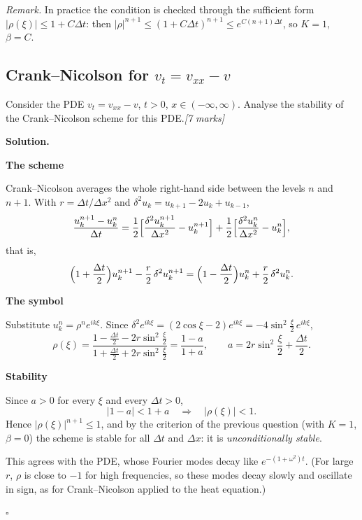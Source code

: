 \documentclass[11pt,a4paper]{article}
\newenvironment{solution}
  {\par\noindent\textbf{Solution.}\par\nobreak}
  {\par\hfill\(\square\)\par}
\newcommand{\step}[1]{\par\addvspace{0.5em}\noindent\textbf{#1}\par\nobreak}
\newcommand{\mk}[1]{\hfill\textit{[#1 marks]}}
\begin{document}
\textit{Remark.}  In practice the condition is checked through the
sufficient form \(|\rho(\xi)|\le1+C\Delta t\): then
\(|\rho|^{n+1}\le(1+C\Delta t)^{n+1}\le e^{C(n+1)\Delta t}\), so
\(K=1\), \(\beta=C\).

\subsection{Crank--Nicolson for \(v_t=v_{xx}-v\)}

\begin{qbox}
Consider the PDE \(v_t=v_{xx}-v\), \(t>0\), \(x\in(-\infty,\infty)\).
Analyse the stability of the Crank--Nicolson scheme for this PDE.\mk{7}
\end{qbox}

\begin{solution}
\step{The scheme}
Crank--Nicolson averages the whole right-hand side between the levels
\(n\) and \(n+1\).  With \(r=\Delta t/\Delta x^2\) and
\(\delta^2u_k=u_{k+1}-2u_k+u_{k-1}\),
\[
  \frac{u_k^{n+1}-u_k^n}{\Delta t}
  =\frac12\Bigl[\frac{\delta^2u_k^{n+1}}{\Delta x^2}-u_k^{n+1}\Bigr]
   +\frac12\Bigl[\frac{\delta^2u_k^{n}}{\Delta x^2}-u_k^{n}\Bigr],
\]
that is,
\[
  \Bigl(1+\frac{\Delta t}2\Bigr)u_k^{n+1}-\frac r2\,\delta^2u_k^{n+1}
  =\Bigl(1-\frac{\Delta t}2\Bigr)u_k^{n}+\frac r2\,\delta^2u_k^{n}.
\]

\step{The symbol}
Substitute \(u_k^n=\rho^ne^{ik\xi}\).  Since
\(\delta^2e^{ik\xi}=(2\cos\xi-2)e^{ik\xi}=-4\sin^2\frac\xi2\,e^{ik\xi}\),
\[
  \rho(\xi)
  =\frac{1-\frac{\Delta t}2-2r\sin^2\frac\xi2}
        {1+\frac{\Delta t}2+2r\sin^2\frac\xi2}
  =\frac{1-a}{1+a},
  \qquad
  a=2r\sin^2\frac\xi2+\frac{\Delta t}2 .
\]

\step{Stability}
Since \(a>0\) for every \(\xi\) and every \(\Delta t>0\),
\[
  |1-a|<1+a\quad\Longrightarrow\quad|\rho(\xi)|<1 .
\]
Hence \(|\rho(\xi)|^{n+1}\le1\), and by the criterion of the previous
question (with \(K=1\), \(\beta=0\)) the scheme is stable for all
\(\Delta t\) and \(\Delta x\): it is \emph{unconditionally stable}.

This agrees with the PDE, whose Fourier modes decay like
\(e^{-(1+\omega^2)t}\).  (For large \(r\), \(\rho\) is close to \(-1\)
for high frequencies, so these modes decay slowly and oscillate in
sign, as for Crank--Nicolson applied to the heat equation.)
\end{solution}

\end{document}
